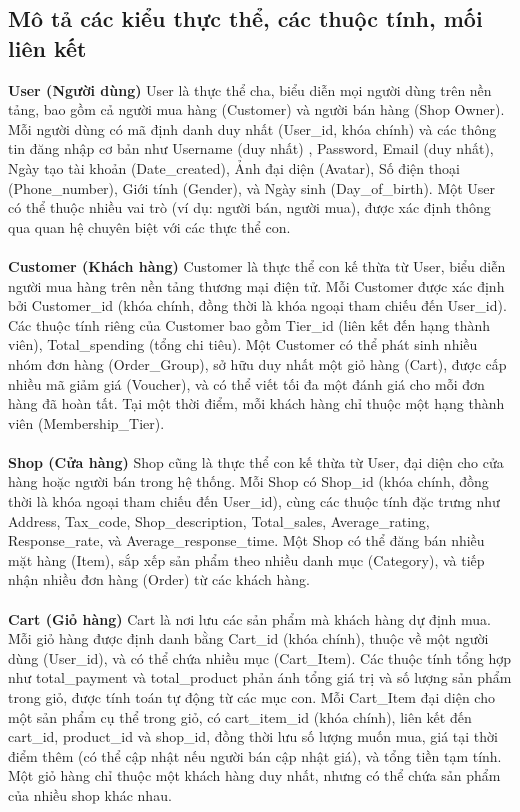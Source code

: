 \subsection{Mô tả các kiểu thực thể, các thuộc tính, mối liên kết}
\hspace*{2em} \textbf{User (Người dùng)} User là thực thể cha, biểu diễn mọi người dùng trên nền tảng, 
bao gồm cả người mua hàng (Customer) và người bán hàng (Shop Owner).
Mỗi người dùng có mã định danh duy nhất (User\_id, khóa chính) và các thông tin đăng nhập cơ bản như Username (duy nhất)
, Password, Email (duy nhất), Ngày tạo tài khoản (Date\_created), Ảnh đại diện (Avatar), Số điện thoại (Phone\_number), 
Giới tính (Gender), và Ngày sinh (Day\_of\_birth).
Một User có thể thuộc nhiều vai trò (ví dụ: người bán, người mua), được xác định thông qua quan hệ chuyên biệt với các thực thể con. \\ \\
\hspace*{2em} \textbf{Customer (Khách hàng)} Customer là thực thể con kế thừa từ User, biểu diễn người mua hàng trên nền tảng thương mại điện tử.
Mỗi Customer được xác định bởi Customer\_id (khóa chính, đồng thời là khóa ngoại tham chiếu đến User\_id).
Các thuộc tính riêng của Customer bao gồm Tier\_id (liên kết đến hạng thành viên), Total\_spending (tổng chi tiêu).
Một Customer có thể phát sinh nhiều nhóm đơn hàng (Order\_Group), sở hữu duy nhất một giỏ hàng (Cart), được cấp nhiều mã giảm giá (Voucher), và có thể viết tối đa một đánh giá cho mỗi đơn hàng đã hoàn tất.
Tại một thời điểm, mỗi khách hàng chỉ thuộc một hạng thành viên (Membership\_Tier). \\ \\
\hspace*{2em} \textbf{Shop (Cửa hàng)} Shop cũng là thực thể con kế thừa từ User, đại diện cho cửa hàng hoặc người bán 
trong hệ thống.
Mỗi Shop có Shop\_id (khóa chính, đồng thời là khóa ngoại tham chiếu đến User\_id), cùng các thuộc tính đặc trưng như 
Address, Tax\_code, Shop\_description, Total\_sales, Average\_rating, Response\_rate, và Average\_response\_time.
Một Shop có thể đăng bán nhiều mặt hàng (Item), sắp xếp sản phẩm theo nhiều danh mục (Category), và tiếp nhận nhiều đơn hàng (Order) từ các khách hàng. \\ \\ 
\hspace*{2em} \textbf{Cart (Giỏ hàng)} Cart là nơi lưu các sản phẩm mà khách hàng dự định mua. Mỗi giỏ hàng được định danh bằng Cart\_id (khóa chính), thuộc về một người dùng (User\_id), và có thể chứa nhiều mục (Cart\_Item). Các thuộc tính tổng hợp như total\_payment và total\_product phản ánh tổng giá trị và số lượng sản phẩm trong giỏ, được tính toán tự động từ các mục con. Mỗi Cart\_Item đại diện cho một sản phẩm cụ thể trong giỏ, có cart\_item\_id (khóa chính), liên kết đến cart\_id, product\_id và shop\_id, đồng thời lưu số lượng muốn mua, giá tại thời điểm thêm (có thể cập nhật nếu người bán cập nhật giá), và tổng tiền tạm tính. Một giỏ hàng chỉ thuộc một khách hàng duy nhất, nhưng có thể chứa sản phẩm của nhiều shop khác nhau. \\
